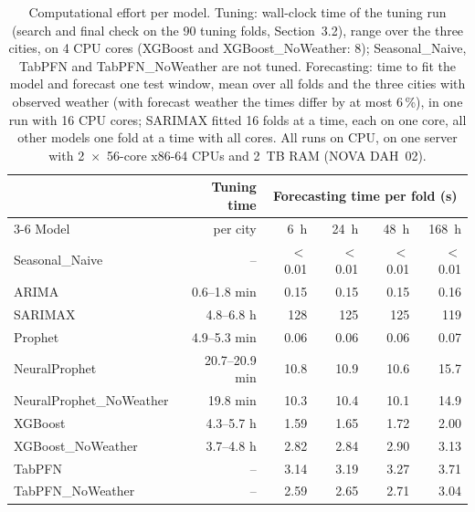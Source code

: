 \begin{table}[htbp]
\centering
\caption{Computational effort per model. Tuning: wall-clock time of the tuning run (search and final check on the 90 tuning folds, Section~3.2), range over the three cities, on 4 CPU cores (XGBoost and XGBoost\_NoWeather: 8); Seasonal\_Naive, TabPFN and TabPFN\_NoWeather are not tuned. Forecasting: time to fit the model and forecast one test window, mean over all folds and the three cities with observed weather (with forecast weather the times differ by at most 6\,\%), in one run with 16 CPU cores; SARIMAX fitted 16 folds at a time, each on one core, all other models one fold at a time with all cores. All runs on CPU, on one server with 2~$\times$~56-core x86-64 CPUs and 2~TB RAM (NOVA DAH~02).}
\label{tab:effort}
\begin{tabular}{lrrrrr}
\toprule
 & Tuning time & \multicolumn{4}{c}{Forecasting time per fold (s)} \\
\cmidrule(lr){3-6}
Model & per city & 6~h & 24~h & 48~h & 168~h \\
\midrule
Seasonal\_Naive & -- & $<$0.01 & $<$0.01 & $<$0.01 & $<$0.01 \\
ARIMA & 0.6--1.8 min & 0.15 & 0.15 & 0.15 & 0.16 \\
SARIMAX & 4.8--6.8 h & 128 & 125 & 125 & 119 \\
Prophet & 4.9--5.3 min & 0.06 & 0.06 & 0.06 & 0.07 \\
NeuralProphet & 20.7--20.9 min & 10.8 & 10.9 & 10.6 & 15.7 \\
NeuralProphet\_NoWeather & 19.8 min & 10.3 & 10.4 & 10.1 & 14.9 \\
XGBoost & 4.3--5.7 h & 1.59 & 1.65 & 1.72 & 2.00 \\
XGBoost\_NoWeather & 3.7--4.8 h & 2.82 & 2.84 & 2.90 & 3.13 \\
TabPFN & -- & 3.14 & 3.19 & 3.27 & 3.71 \\
TabPFN\_NoWeather & -- & 2.59 & 2.65 & 2.71 & 3.04 \\
\bottomrule
\end{tabular}
\end{table}
